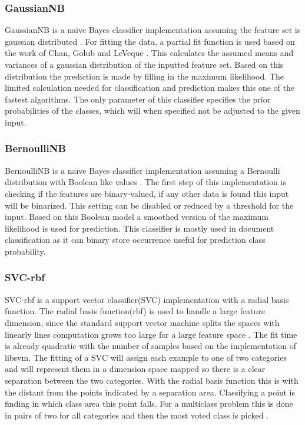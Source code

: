 \documentclass[a4paper,10pt]{article}
\begin{document}
\subsubsection{GaussianNB}
GaussianNB is a naïve Bayes classifier implementation assuming the feature set is gaussian distributed \cite{Bayes}. For fitting the data, a partial fit function is used based on the work of Chan, Golub and LeVeque \cite{Sam-var}. This calculates the assumed means and variances of a gaussian distribution of the inputted feature set. Based on this distribution the prediction is made by filling in the maximum likelihood. The limited calculation needed for classification and prediction makes this one of the fastest algorithms. The only parameter of this classifier specifies the prior probabilities of the classes, which will when specified not be adjusted to the given input. 

\subsubsection{BernoulliNB}
BernoulliNB is a naïve Bayes classifier implementation assuming a Bernoulli distribution with Boolean like values \cite{NB-text}. The first step of this implementation is checking if the features are binary-valued, if any other data is found this input will be binarized. This setting can be disabled or reduced by a threshold for the input. Based on this Boolean model a smoothed version of the maximum likelihood is used for prediction. This classifier is mostly used in document classification as it can binary store occurrence useful for prediction class probability. 

\subsubsection{SVC-rbf}
SVC-rbf is a support vector classifier(SVC) implementation with a radial basis function. The radial basis function(rbf) is used to handle a large feature dimension, since the standard support vector machine splits the spaces with linearly lines computation grows too large for a large feature space \cite{SVN}. The fit time is already quadratic with the number of samples based on the implementation of libsvm\cite{SVM}. The fitting of a SVC will assign each example to one of two categories and will represent them in a dimension space mapped so there is a clear separation between the two categories. With the radial basis function this is with the distant from the points indicated by a separation area. Classifying a point is finding in which class area this point falls. For a multiclass problem this is done in pairs of two for all categories and then the most voted class is picked \cite{Multi-pair-coup}.%
\end{document}
